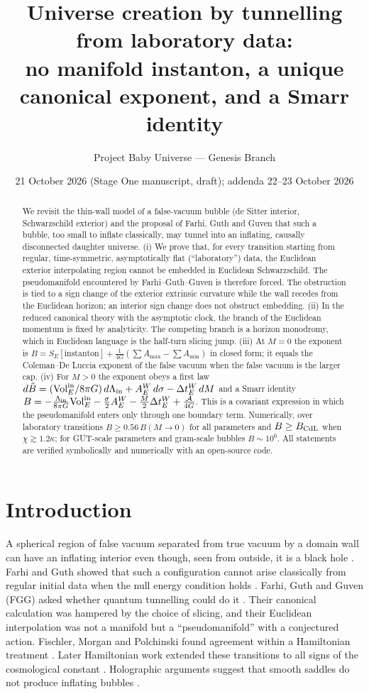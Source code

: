 \documentclass[11pt,a4paper]{article}
\title{Universe creation by tunnelling from laboratory data:\\
no manifold instanton, a unique canonical exponent, and a Smarr identity}
\author{Project Baby Universe --- Genesis Branch}
\date{21 October 2026 (Stage One manuscript, draft); addenda 22--23 October 2026}
\theoremstyle{remark}\newtheorem{remark}[theorem]{Remark}
\begin{document}
\maketitle

\begin{abstract}
We revisit the thin-wall model of a false-vacuum bubble (de Sitter interior, Schwarzschild exterior) and the
proposal of Farhi, Guth and Guven that such a bubble, too small to inflate classically, may tunnel into an
inflating, causally disconnected daughter universe. (i) We prove that, for every transition starting from regular,
time-symmetric, asymptotically flat (``laboratory'') data, the Euclidean exterior interpolating region cannot be
embedded in Euclidean Schwarzschild. The pseudomanifold encountered by Farhi--Guth--Guven is therefore forced. The
obstruction is tied to a sign change of the exterior extrinsic curvature while the wall recedes from the Euclidean
horizon; an interior sign change does not obstruct embedding. (ii) In the reduced canonical theory with the asymptotic
clock, the branch of the Euclidean momentum is fixed by analyticity. The competing branch is a horizon monodromy, which
in Euclidean language is the half-turn slicing jump. (iii) At $M=0$ the exponent is
$B=S_E[\text{instanton}]+\frac1{4G}(\sum A_{\max}-\sum A_{\min})$ in closed form; it equals the Coleman--De Luccia
exponent of the false vacuum when the false vacuum is the larger cap. (iv) For $M>0$ the exponent obeys a first law
$d\tilde B=({\rm Vol}^{\rm in}_E/8\pi G)\,d\Lambda_{\rm in}+A^W_E\,d\sigma-\Delta t^W_E\,dM$ and a Smarr identity
$B=-\frac{\Lambda_{\rm in}}{8\pi G}{\rm Vol}^{\rm in}_E-\frac\sigma2A^W_E-\frac M2\Delta t^W_E+\frac{\mathcal A}{4G}$.
This is a covariant expression in which the pseudomanifold enters only through one boundary term. Numerically, over
laboratory transitions $B\ge0.56\,B(M\!\to\!0)$ for all parameters and $B\ge B_{\rm CdL}$ when $\chi\gtrsim1.2\kappa$; for GUT-scale
parameters and gram-scale bubbles $B\sim10^6$. All statements are verified symbolically and numerically with an
open-source code.
\end{abstract}

\section{Introduction}
A spherical region of false vacuum separated from true vacuum by a domain wall can have an inflating interior even
though, seen from outside, it is a black hole \cite{BGG}. Farhi and Guth showed that such a configuration cannot
arise classically from regular initial data when the null energy condition holds \cite{FG}. Farhi, Guth and Guven
(FGG) asked whether quantum tunnelling could do it \cite{FGG}. Their canonical calculation was hampered by the choice
of slicing, and their Euclidean interpolation was not a manifold but a ``pseudomanifold'' with a conjectured action.
Fischler, Morgan and Polchinski found agreement within a Hamiltonian treatment \cite{FMP}. Later Hamiltonian work
extended these transitions to all signs of the cosmological constant \cite{dealwis,cespedes}. Holographic arguments
suggest that smooth saddles do not produce inflating bubbles \cite{Freivogel,FuMarolf}.
\end{document}
